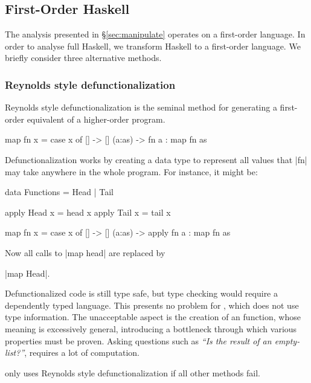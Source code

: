 \subsection{First-Order Haskell}

The analysis presented in \S\ref{sec:manipulate} operates on a first-order language. In order to analyse full Haskell, we transform Haskell to a first-order language. We briefly consider three alternative methods.

\subsubsection{Reynolds style defunctionalization}

Reynolds style defunctionalization \citep{reynolds:defunc} is the seminal method for generating a first-order equivalent of a higher-order program.

\begin{example}
\begin{code}
map fn x = case  x of
                 []      -> []
                 (a:as)  -> fn a : map fn as
\end{code}

\noindent Defunctionalization works by creating a data type to represent all values that |fn| may take anywhere in the whole program. For instance, it might be:

\ignore\begin{code}
data Functions = Head | Tail

apply Head  x = head  x
apply Tail  x = tail  x

map fn x = case  x of
                 []      -> []
                 (a:as)  -> apply fn a : map fn as
\end{code}

\noindent Now all calls to |map head| are replaced by \ignore|map Head|.
\end{example}

Defunctionalized code is still type safe, but type checking would require a dependently typed language. This presents no problem for \catch{}, which does not use type information. The unacceptable aspect is the creation of an  function, whose meaning is excessively general, introducing a bottleneck through which various properties must be proven. Asking questions such as \textit{``Is the result of  an empty-list?''}, requires a lot of computation.

\catch{} only uses Reynolds style defunctionalization if all other methods fail.


